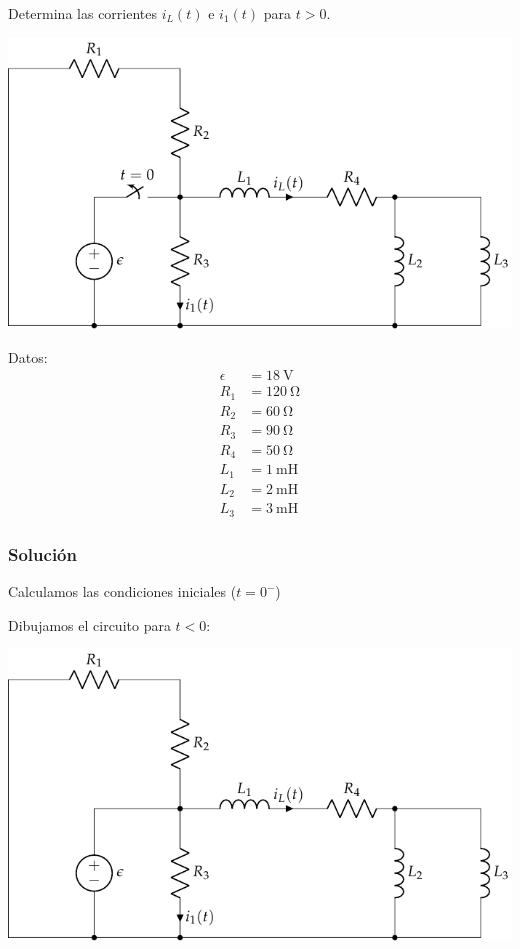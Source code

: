 \documentclass[12pt]{article}
\begin{document}
Determina las corrientes $i_L(t)$ e $i_1(t)$ para $t > 0$.

\begin{minipage}{0.7\textwidth}
\includegraphics{figs/HKD84}
\end{minipage}
\hfill
\begin{minipage}{0.3\textwidth}
Datos:
\begin{align*}
  \epsilon &= \SI{18}{\volt}\\
  R_1 &= \SI{120}{\ohm}\\
  R_2 &= \SI{60}{\ohm}\\
  R_3 &= \SI{90}{\ohm}\\
  R_4 &= \SI{50}{\ohm}\\
  L_1 &= \SI{1}{\milli\henry}\\
  L_2 &= \SI{2}{\milli\henry}\\
  L_3 &= \SI{3}{\milli\henry}
\end{align*}
\end{minipage}

\subsubsection*{Solución}

Calculamos las condiciones iniciales ($t = 0^-$)

Dibujamos el circuito para $t < 0$:

\begin{center}
  \includegraphics[scale=0.85]{figs/HKD84_t0-}
\end{center}
\end{document}
